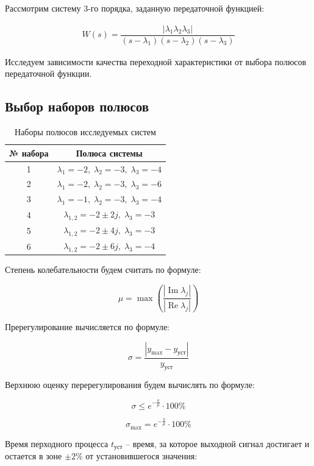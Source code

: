 \documentclass[a5paper, 10pt]{article}
\theoremstyle{definition}
\theoremstyle{plain}
\theoremstyle{remark}
\begin{document}
Рассмотрим систему 3-го порядка, заданную передаточной функцией:

\begin{align}\label{du1}
    W(s)=\dfrac{|\lambda_1\lambda_2\lambda_3|}{(s-\lambda_1)(s-\lambda_2)(s-\lambda_3)}
\end{align}

Исследуем зависимости качества переходной характеристики от выбора полюсов передаточной функции.

\subsection{Выбор наборов полюсов}

\begin{table}[H]
\centering
\begin{tabular}{|c|c|}
\hline
№ набора & Полюса системы \\ \hline
1 & $\lambda_1=-2,\;\lambda_2=-3,\;\lambda_3=-4$ \\ \hline
2 & $\lambda_1=-2,\;\lambda_2=-3,\;\lambda_3=-6$ \\ \hline
3 & $\lambda_1=-1,\;\lambda_2=-3,\;\lambda_3=-4$ \\ \hline
4 & $\lambda_{1,2}=-2\pm 2j,\;\lambda_3=-3$ \\ \hline
5 & $\lambda_{1,2}=-2\pm 4j,\;\lambda_3=-3$ \\ \hline
6 & $\lambda_{1,2}=-2\pm 6j,\;\lambda_3=-4$ \\ \hline
\end{tabular}
\caption{Наборы полюсов исследуемых систем}
\label{tab:poles}
\end{table}

Степень колебательности будем считать по формуле:

$$
\mu=\max\left(\frac{|\operatorname{Im}\lambda_j|}{|\operatorname{Re}\lambda_j|}\right)
$$

Пререгулирование вычисляется по формуле:

$$
\sigma=\dfrac{|y_{\max}-y_{\text{уст}}|}{y_{\text{уст}}}
$$

Верхнюю оценку перерегулирования будем вычислять по формуле:

$$
\sigma \leq e^{-\frac{\pi}{\mu}} \cdot 100\%
$$

$$
\sigma_{\max} = e^{-\frac{\pi}{\mu}} \cdot 100\%
$$

Время перходного процесса $t_{\text{уст}}$ -- время, за которое выходной сигнал достигает и остается в зоне $\pm2\%$ от установившегося значения:
\end{document}
